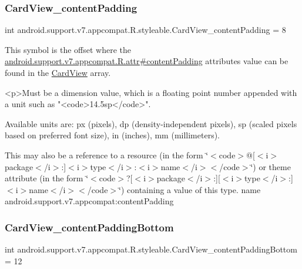 \subsubsection{\texorpdfstring{Card\+View\+\_\+content\+Padding}{CardView\_contentPadding}}
{\footnotesize\ttfamily int android.\+support.\+v7.\+appcompat.\+R.\+styleable.\+Card\+View\+\_\+content\+Padding = 8\hspace{0.3cm}{\ttfamily [static]}}

This symbol is the offset where the \hyperlink{classandroid_1_1support_1_1v7_1_1appcompat_1_1R_1_1attr_ac9b82d0a6109c603a1761c5f3da4c700}{android.\+support.\+v7.\+appcompat.\+R.\+attr\#content\+Padding} attribute\textquotesingle{}s value can be found in the \hyperlink{classandroid_1_1support_1_1v7_1_1appcompat_1_1R_1_1styleable_aee2dd81febffbeeaeff51a35af0f87ec}{Card\+View} array.

\begin{DoxyVerb}      <p>Must be a dimension value, which is a floating point number appended with a unit such as "<code>14.5sp</code>".
\end{DoxyVerb}
 Available units are\+: px (pixels), dp (density-\/independent pixels), sp (scaled pixels based on preferred font size), in (inches), mm (millimeters). 

This may also be a reference to a resource (in the form \char`\"{}$<$code$>$@\mbox{[}$<$i$>$package$<$/i$>$\+:\mbox{]}$<$i$>$type$<$/i$>$\+:$<$i$>$name$<$/i$>$$<$/code$>$\char`\"{}) or theme attribute (in the form \char`\"{}$<$code$>$?\mbox{[}$<$i$>$package$<$/i$>$\+:\mbox{]}\mbox{[}$<$i$>$type$<$/i$>$\+:\mbox{]}$<$i$>$name$<$/i$>$$<$/code$>$\char`\"{}) containing a value of this type.  name android.\+support.\+v7.\+appcompat\+:content\+Padding \mbox{\label{classandroid_1_1support_1_1v7_1_1appcompat_1_1R_1_1styleable_ad74f332eb543e2022b522e83a8f03c3a}} 
\subsubsection{\texorpdfstring{Card\+View\+\_\+content\+Padding\+Bottom}{CardView\_contentPaddingBottom}}
{\footnotesize\ttfamily int android.\+support.\+v7.\+appcompat.\+R.\+styleable.\+Card\+View\+\_\+content\+Padding\+Bottom = 12\hspace{0.3cm}{\ttfamily [static]}}

